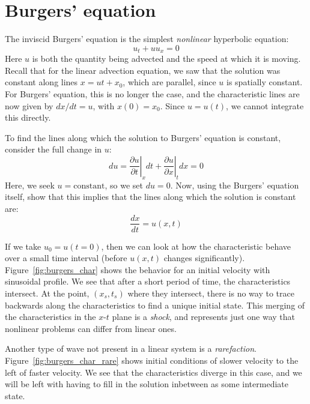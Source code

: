 \label{ch:burgers}

\section{Burgers' equation}

The inviscid Burgers' equation is the simplest {\em nonlinear} hyperbolic
equation:
\begin{equation}
u_t + u u_x = 0
\end{equation}
Here $u$ is both the quantity being advected and the speed at which
it is moving.  Recall that for the linear advection equation, we saw
that the solution was constant along lines $x = ut + x_0$, which are
parallel, since $u$ is spatially constant.  For Burgers' equation,
this is no longer the case, and the characteristic lines are now
given by $dx/dt = u$, with $x(0) = x_0$.  Since $u = u(t)$, we cannot
integrate this directly.

\begin{exercise}
{To find the lines along which the solution to Burgers' equation is
constant, consider the full change in $u$:
\begin{equation}
du = \left . \frac{\partial u}{\partial t} \right |_x dt +
     \left . \frac{\partial u}{\partial x} \right |_t dx = 0
\end{equation}
Here, we seek $u = \mathrm{constant}$, so we set $du = 0$.  Now,
using the Burgers' equation itself, show that this implies that
the lines along which the solution is constant are:
\begin{equation}
\frac{dx}{dt} = u(x,t)
\end{equation}
}
\end{exercise}

If we take $u_0 = u(t=0)$, then we can look at how the characteristic
behave over a small time interval (before $u(x,t)$ changes
significantly).  Figure~\ref{fig:burgers_char} shows the behavior for
an initial velocity with sinusoidal profile.  We see that after a
short period of time, the characteristics intersect.  At the point,
$(x_s, t_s)$ where they intersect, there is no way to trace backwards
along the characteristics to find a unique initial state.  This
merging of the characteristics in the $x$-$t$ plane is a {\em shock}, and
represents just one way that nonlinear problems can differ from linear
ones.

Another type of wave not present in a linear system is a {\em
  rarefaction}.  Figure~\ref{fig:burgers_char_rare} shows initial
conditions of slower velocity to the left of faster velocity.  We see
that the characteristics diverge in this case, and we will be left
with having to fill in the solution inbetween as some intermediate
state.


